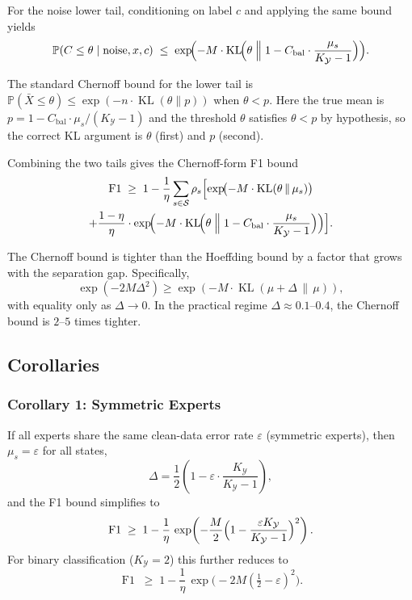 For the noise lower tail, conditioning on label $c$ and applying the same
bound yields
\[
\mathbb{P}(C \leq \theta \mid \text{noise}, x, c)
\;\leq\; \exp\!\Bigl(
  -M \cdot \operatorname{KL}\!\Bigl(\theta \;\Big\|\;
   1 - C_{\text{bal}}\cdot\frac{\mu_s}{K_{\mathcal{Y}}-1}\Bigr)
\Bigr).
\]

\begin{remark}[KL direction]
\label{remark:kl-direction}
The standard Chernoff bound for the lower tail is
$\mathbb{P}(\bar{X} \leq \theta) \leq \exp(-n \cdot \operatorname{KL}(\theta \| p))$
when $\theta < p$. Here the true mean is
$p = 1 - C_{\text{bal}}\cdot\mu_s/(K_{\mathcal{Y}}-1)$ and the threshold
$\theta$ satisfies $\theta < p$ by hypothesis, so the correct KL argument is
$\theta$ (first) and $p$ (second).
\end{remark}

Combining the two tails gives the Chernoff-form F1 bound
\begin{multline}
\operatorname{F1} \;\geq\; 1
- \frac{1}{\eta}\sum_{s \in \mathcal{S}} \rho_s
\Bigl[ \exp\!\bigl(-M \cdot \operatorname{KL}(\theta \,\|\, \mu_s)\bigr) \\
+ \frac{1-\eta}{\eta} \cdot
\exp\!\Bigl(-M \cdot \operatorname{KL}\!\Bigl(\theta \;\Big\|\;
  1 - C_{\text{bal}}\cdot\frac{\mu_s}{K_{\mathcal{Y}}-1}\Bigr)\Bigr)
\Bigr].
\label{eq:f1-bound-chernoff}
\end{multline}

The Chernoff bound is tighter than the Hoeffding bound by a factor that grows
with the separation gap. Specifically,
\[
\exp(-2M\Delta^2) \geq \exp(-M \cdot \operatorname{KL}(\mu + \Delta \,\|\, \mu)),
\]
with equality only as $\Delta \to 0$. In the practical regime
$\Delta \approx 0.1$--$0.4$, the Chernoff bound is $2$--$5$ times tighter.

\subsection{Corollaries}
\label{sec:thm1:corollaries}

\subsubsection*{Corollary 1: Symmetric Experts}
If all experts share the same clean-data error rate $\varepsilon$ (symmetric
experts), then $\mu_s = \varepsilon$ for all states,
\[
\Delta = \frac12\!\left(1 - \varepsilon\cdot\frac{K_{\mathcal{Y}}}{K_{\mathcal{Y}}-1}\right),
\]
and the F1 bound simplifies to
\begin{equation}
\operatorname{F1} \;\geq\; 1 - \frac{1}{\eta}\,
\exp\!\left(-\frac{M}{2}\Bigl(1 - \frac{\varepsilon K_{\mathcal{Y}}}{K_{\mathcal{Y}}-1}\Bigr)^2\right).
\label{eq:cor-symmetric}
\end{equation}
For binary classification ($K_{\mathcal{Y}}=2$) this further reduces to
\[
\operatorname{F1} \;\geq\; 1 - \frac{1}{\eta}\,
\exp\!\bigl(-2M(\tfrac12 - \varepsilon)^2\bigr).
\]

